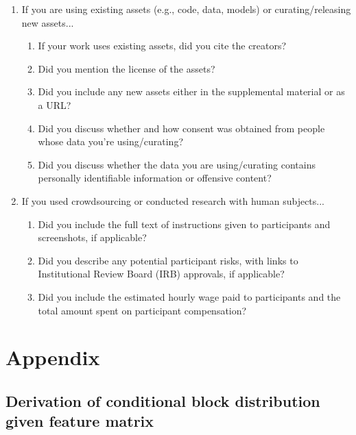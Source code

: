 \documentclass{article}
\begin{document}
\begin{enumerate}
\item If you are using existing assets (e.g., code, data, models) or curating/releasing new assets...
\begin{enumerate}
  \item If your work uses existing assets, did you cite the creators?
    \answerTODO{}
  \item Did you mention the license of the assets?
    \answerTODO{}
  \item Did you include any new assets either in the supplemental material or as a URL?
    \answerTODO{}
  \item Did you discuss whether and how consent was obtained from people whose data you're using/curating?
    \answerTODO{}
  \item Did you discuss whether the data you are using/curating contains personally identifiable information or offensive content?
    \answerTODO{}
\end{enumerate}

\item If you used crowdsourcing or conducted research with human subjects...
\begin{enumerate}
  \item Did you include the full text of instructions given to participants and screenshots, if applicable?
    \answerTODO{}
  \item Did you describe any potential participant risks, with links to Institutional Review Board (IRB) approvals, if applicable?
    \answerTODO{}
  \item Did you include the estimated hourly wage paid to participants and the total amount spent on participant compensation?
    \answerTODO{}
\end{enumerate}

\end{enumerate}


\appendix

\section{Appendix}

\subsection{Derivation of conditional block distribution given feature matrix}
\label{appdx:b|x}
\end{document}

